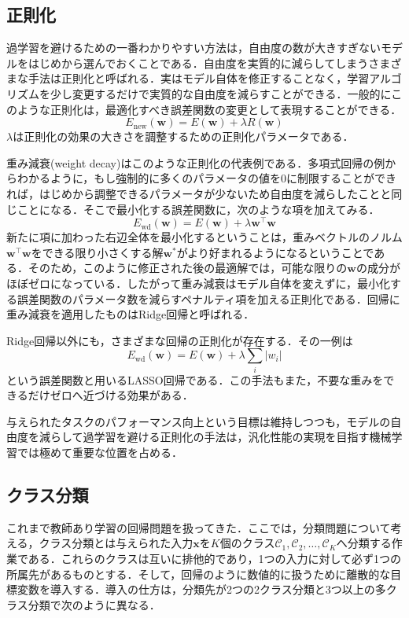 \documentclass[a4paper,11pt]{jsreport}
\begin{document}
\subsection{正則化}
過学習を避けるための一番わかりやすい方法は，自由度の数が大きすぎないモデルをはじめから選んでおくことである．自由度を実質的に減らしてしまうさまざまな手法は正則化と呼ばれる．実はモデル自体を修正することなく，学習アルゴリズムを少し変更するだけで実質的な自由度を減らすことができる．一般的にこのような正則化は，最適化すべき誤差関数の変更として表現することができる．
\begin{equation}
  E_{\text{new}}(\bm{w}) 
  = E(\bm{w}) + \lambda R(\bm{w})
\end{equation}
$\lambda$は正則化の効果の大きさを調整するための正則化パラメータである．\par
重み減衰(weight decay)はこのような正則化の代表例である．多項式回帰の例からわかるように，もし強制的に多くのパラメータの値を0に制限することができれば，はじめから調整できるパラメータが少ないため自由度を減らしたことと同じことになる．そこで最小化する誤差関数に，次のような項を加えてみる．
\begin{equation}
  E_{\text{wd}}(\bm{w}) 
  = E(\bm{w}) + \lambda \bm{w}^{\top} \bm{w}
\end{equation}
新たに項に加わった右辺全体を最小化するということは，重みベクトルのノルム$\bm{w}^{\top} \bm{w}$をできる限り小さくする解$\bm{w}^*$がより好まれるようになるということである．そのため，このように修正された後の最適解では，可能な限りの$\bm{w}$の成分がほぼゼロになっている．したがって重み減衰はモデル自体を変えずに，最小化する誤差関数のパラメータ数を減らすペナルティ項を加える正則化である．回帰に重み減衰を適用したものはRidge回帰と呼ばれる．\par
Ridge回帰以外にも，さまざまな回帰の正則化が存在する．その一例は
\begin{equation}
  E_{\text{wd}}(\bm{w}) 
  = E(\bm{w}) + \lambda \sum_i |w_i|
\end{equation}
という誤差関数と用いるLASSO回帰である．この手法もまた，不要な重みをできるだけゼロへ近づける効果がある．\par
与えられたタスクのパフォーマンス向上という目標は維持しつつも，モデルの自由度を減らして過学習を避ける正則化の手法は，汎化性能の実現を目指す機械学習では極めて重要な位置を占める．


\subsection{クラス分類}
これまで教師あり学習の回帰問題を扱ってきた．ここでは，分類問題について考える，クラス分類とは与えられた入力$\bm{x}$を$K$個のクラス$\mathcal{C}_1, \mathcal{C}_2, \dots, \mathcal{C}_K$へ分類する作業である．これらのクラスは互いに排他的であり，1つの入力に対して必ず1つの所属先があるものとする．そして，回帰のように数値的に扱うために離散的な目標変数を導入する．導入の仕方は，分類先が2つの2クラス分類と3つ以上の多クラス分類で次のように異なる．
\end{document}
